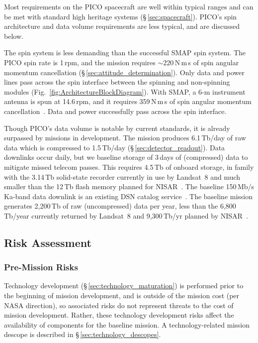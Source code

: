
Most requirements on the PICO spacecraft are well within typical ranges and can be met with standard high heritage systems (\S\,\ref{sec:spacecraft}). PICO's spin architecture and data volume requirements are less typical, and are discussed below.

The spin system is less demanding than the successful SMAP spin system. The PICO spin rate is 1\,rpm, and the mission requires $\sim220$\,N\,m\,s of spin angular momentum cancellation (\S\,\ref{sec:attitude_determination}).
Only data and power lines pass across the spin interface between the spinning and non-spinning modules (Fig.~\ref{fig:ArchitectureBlockDiagram}). With SMAP, a 6-m instrument antenna is spun at 14.6\,rpm, and it requires  359\,N\,m\,s of spin angular momentum cancellation~\citep{Brown2016}. Data and power successfully pass across the spin interface. 

Though PICO's data volume is notable by current standards, it is already surpassed by missions in development. The mission produces 6.1\,Tb/day of raw data which is compressed to 1.5\,Tb/day (\S\,\ref{sec:detector_readout}). Data downlinks occur daily, but we baseline storage of 3\,days of (compressed) data to mitigate missed telecom passes. This requires 4.5\,Tb of onboard storage, in family with the 3.14\,Tb solid-state recorder currently in use by Landsat~8 and much smaller than the 12\,Tb flash memory planned for NISAR~\citep{Jasper2017}. The baseline 150\,Mb/s Ka-band data downlink is an existing DSN catalog service~\citep{DSN2015}. The baseline mission generates 2,200\,Tb of raw (uncompressed) data per year, less than the 6,800\,Tb/year currently returned by Landsat~8 and 9,300\,Tb/yr planned by NISAR~\citep{Jasper2017}.

\subsection{Risk Assessment}
\label{sec:risk_assessment} %

\subsubsection{Pre-Mission Risks}
\label{sec:premission_risks} %

Technology development (\S\,\ref{sec:technology_maturation}) is performed prior to the beginning of mission development, and is outside of the mission cost (per NASA direction), so associated risks do not represent threats to the cost of mission development. Rather, these technology development risks affect the availability of components for the baseline mission. A technology-related mission descope is described in \S\,\ref{sec:technology_descopes}.

